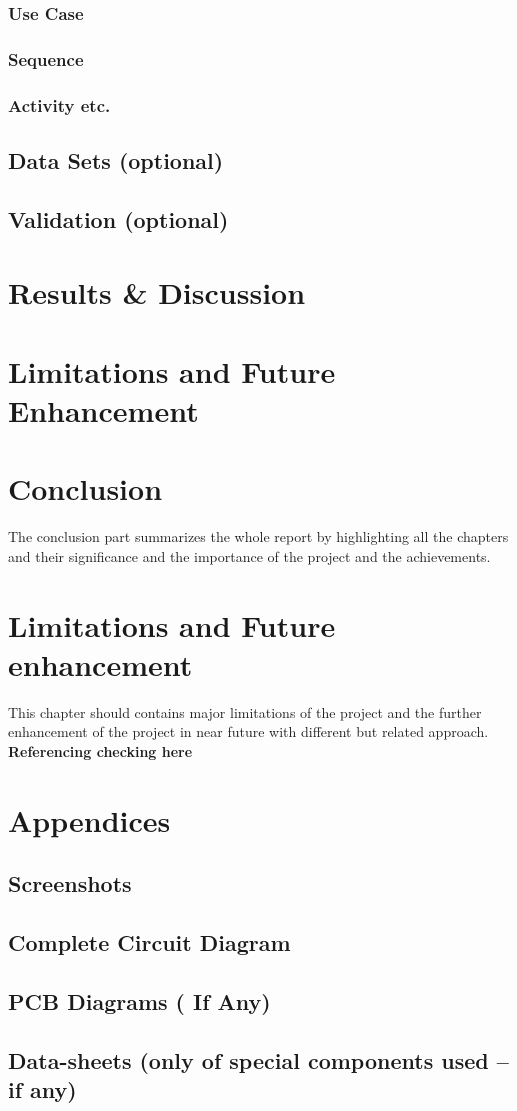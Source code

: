 \documentclass[12pt,a4paper]{report}
\begin{document}
\subsection{Use Case}
\subsection{Sequence}
\subsection{Activity etc.}
\section{Data Sets (optional)}
\section{Validation (optional)}
\chapter{Results \& Discussion}
\chapter{Limitations and Future Enhancement}
\chapter{Conclusion}
The conclusion part summarizes the whole report by highlighting all the chapters and their significance and the importance of the project and the achievements.
\chapter{Limitations and Future enhancement}
This chapter should contains major limitations of the project and the further enhancement of the project in near future with different but related approach. \textbf{Referencing checking here}\cite{giri2019transfer}
\renewcommand{\bibname}{References}


\chapter*{Appendices}
\section*{Screenshots}
\section*{Complete Circuit Diagram}
\section*{PCB Diagrams ( If Any)}
\section*{Data-sheets (only of special components used – if any)}
\end{document}
